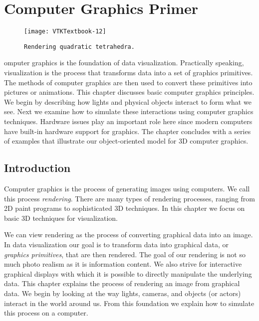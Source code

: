 \chapter{Computer Graphics Primer}
\label{chap:computer_graphics_primer}

\begin{figure}[ht]
	\hfill
	\begin{minipage}{0.5\textwidth}
		\centering
		\texttt{[image: VTKTextbook-12]}\\
		\caption*{\texttt{Rendering quadratic tetrahedra.}}
	\end{minipage}
\end{figure}

omputer graphics is the foundation of data visualization. Practically speaking, visualization is the process that transforms data into a set of graphics primitives. The methods of computer graphics are then used to convert these primitives into pictures or animations. This chapter discusses basic computer graphics principles. We begin by describing how lights and physical objects interact to form what we see. Next we examine how to simulate these interactions using computer graphics techniques. Hardware issues play an important role here since modern computers have built-in hardware support for graphics. The chapter concludes with a series of examples that illustrate our object-oriented model for 3D computer graphics.

\section{Introduction}

Computer graphics is the process of generating images using computers. We call this process \emph{rendering}. There are many types of rendering processes, ranging from 2D paint programs to sophisticated 3D techniques. In this chapter we focus on basic 3D techniques for visualization.

We can view rendering as the process of converting graphical data into an image. In data visualization our goal is to transform data into graphical data, or \emph{graphics primitives}, that are then rendered. The goal of our rendering is not so much photo realism as it is information content. We also strive for interactive graphical displays with which it is possible to directly manipulate the underlying data. This chapter explains the process of rendering an image from graphical data. We begin by looking at the way lights, cameras, and objects (or actors) interact in the world around us. From this foundation we explain how to simulate this process on a computer.

